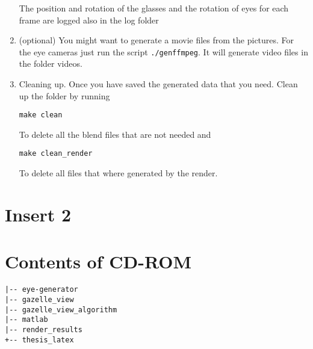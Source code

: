 \begin{enumerate}
	The position and rotation of the glasses and the rotation of eyes for each frame are logged also in the log folder
	\item(optional) You might want to generate a movie files from the pictures. For the eye cameras just run the script \texttt{./genffmpeg}. It will generate video files in the folder videos.
	\item Cleaning up. Once you have saved the generated data that you need. Clean up the folder by running
	
	\texttt{make clean}
	
	To delete all the blend files that are not needed and
	
	\texttt{make clean\_render}
	
	To delete all files that where generated by the render. 

\end{enumerate}
\chapter*{Insert 2}
\cleardoubleemptypage
\chapter*{Contents of CD-ROM}
\begin{lstlisting}[style=ascii-tree]
|-- eye-generator
|-- gazelle_view
|-- gazelle_view_algorithm
|-- matlab
|-- render_results
+-- thesis_latex
\end{lstlisting}



